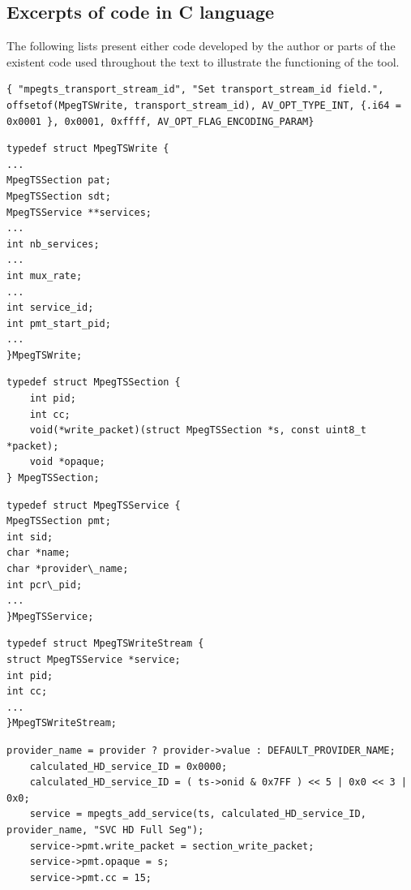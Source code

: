 \documentclass[
	12pt,				%
	openright,			%
	twoside,			%
	a4paper,			%
	brazil,
	french,				%
	english
	]{abntex2}
\begin{document}
\begin{apendicesenv}
\chapter{Excerpts of code in C language}

The following lists present either code developed by the author or parts of the existent code used throughout the text to illustrate the functioning of the tool.

\begin{lstlisting}[caption={Example of input option}, label=lst_input_option]
{ "mpegts_transport_stream_id", "Set transport_stream_id field.", offsetof(MpegTSWrite, transport_stream_id), AV_OPT_TYPE_INT, {.i64 = 0x0001 }, 0x0001, 0xffff, AV_OPT_FLAG_ENCODING_PARAM}
\end{lstlisting}

\begin{lstlisting}[caption={Excerpt of MpegTSWrite structure}, label=lst_MpegTSWrite]
typedef struct MpegTSWrite {
...
MpegTSSection pat;
MpegTSSection sdt;
MpegTSService **services;
...
int nb_services;
...
int mux_rate;
...
int service_id;
int pmt_start_pid;
...
}MpegTSWrite;
\end{lstlisting}

\begin{lstlisting}[caption={Excerpt of MpegTSSection structure}, label=lst_MpegTSSection]
typedef struct MpegTSSection {
	int pid;
	int cc;
	void(*write_packet)(struct MpegTSSection *s, const uint8_t *packet);
	void *opaque;
} MpegTSSection;
\end{lstlisting}

\begin{lstlisting}[caption={Excerpt of MpegTSService structure}, label=lst_MpegTSService]
typedef struct MpegTSService {
MpegTSSection pmt; 
int sid; 
char *name;
char *provider\_name;
int pcr\_pid;
...
}MpegTSService;
\end{lstlisting}

\begin{lstlisting}[caption={Excerpt of MpegTSWriteStream structure}, label=lst_MpegTSWriteStream]
typedef struct MpegTSWriteStream {
struct MpegTSService *service;
int pid;
int cc;
...
}MpegTSWriteStream;
\end{lstlisting}

\begin{lstlisting}[caption={}, label=[]
    provider_name = provider ? provider->value : DEFAULT_PROVIDER_NAME;
	calculated_HD_service_ID = 0x0000;
	calculated_HD_service_ID = ( ts->onid & 0x7FF ) << 5 | 0x0 << 3 | 0x0;
	service = mpegts_add_service(ts, calculated_HD_service_ID, provider_name, "SVC HD Full Seg");
	service->pmt.write_packet = section_write_packet;
	service->pmt.opaque = s;
	service->pmt.cc = 15;


\end{lstlisting}
\end{apendicesenv}
\end{document}
